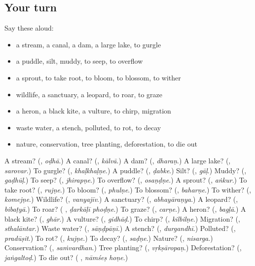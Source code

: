 \subsection*{Your turn}
Say these aloud:

\begin{itemize}
\raggedright
  \item a stream, a canal, a dam, a large lake, to gurgle
  \item a puddle, silt, muddy, to seep, to overflow
  \item a sprout, to take root, to bloom, to blossom, to wither
  \item wildlife, a sanctuary, a leopard, to roar, to graze
  \item a heron, a black kite, a vulture, to chirp, migration
  \item waste water, a stench, polluted, to rot, to decay
  \item nature, conservation, tree planting, deforestation, to die out
\end{itemize}

\begin{tcolorbox}[breakable,colback=teal!4,colframe=teal!35!black,title={Before you move on}]
A stream? (\textbf{}, \emph{oḍhā}.) A canal? (\textbf{}, \emph{kālvā}.) A dam? (\textbf{}, \emph{dharaṇ}.) A large lake? (\textbf{}, \emph{sarovar}.) To gurgle? (\textbf{}, \emph{khaḷkhaḷṇe}.) A puddle? (\textbf{}, \emph{ḍabke}.) Silt? (\textbf{}, \emph{gāḷ}.) Muddy? (\textbf{}, \emph{gaḍhūḷ}.) To seep? (\textbf{}, \emph{jhirapṇe}.) To overflow? (\textbf{}, \emph{osaṇḍṇe}.) A sprout? (\textbf{}, \emph{aṅkur}.) To take root? (\textbf{}, \emph{rujṇe}.) To bloom? (\textbf{}, \emph{phulṇe}.) To blossom? (\textbf{}, \emph{baharṇe}.) To wither? (\textbf{}, \emph{komejṇe}.) Wildlife? (\textbf{}, \emph{vanyajīv}.) A sanctuary? (\textbf{}, \emph{abhayāraṇya}.) A leopard? (\textbf{}, \emph{bibaṭyā}.) To roar? (\textbf{ }, \emph{ḍarkāḷī phoḍṇe}.) To graze? (\textbf{}, \emph{carṇe}.) A heron? (\textbf{}, \emph{bagḷā}.) A black kite? (\textbf{}, \emph{ghār}.) A vulture? (\textbf{}, \emph{gidhāḍ}.) To chirp? (\textbf{}, \emph{kilbilṇe}.) Migration? (\textbf{}, \emph{sthalāntar}.) Waste water? (\textbf{}, \emph{sāṇḍpāṇī}.) A stench? (\textbf{}, \emph{durgandhī}.) Polluted? (\textbf{}, \emph{pradūṣit}.) To rot? (\textbf{}, \emph{kujṇe}.) To decay? (\textbf{}, \emph{saḍṇe}.) Nature? (\textbf{}, \emph{nisarga}.) Conservation? (\textbf{}, \emph{saṁvardhan}.) Tree planting? (\textbf{}, \emph{vṛkṣāropaṇ}.) Deforestation? (\textbf{}, \emph{jaṅgaltoḍ}.) To die out? (\textbf{ }, \emph{nāmśeṣ hoṇe}.)
\end{tcolorbox}
